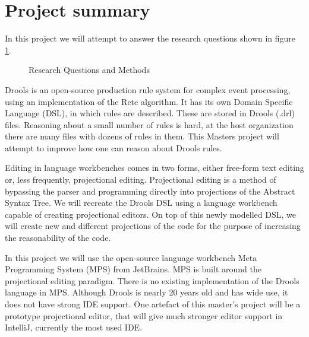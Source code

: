 \section{Project summary}

In this project we will attempt to answer the research questions shown in figure \ref{fig:Research_Questions}.
\begin{figure}[H]
    \centering
    \caption{Research Questions and Methods}
    \label{fig:Research_Questions}
\end{figure}


Drools\cite{browne2009jboss} is an open-source production rule system for complex event processing, using an implementation of the Rete algorithm\cite{forgy1989rete}.
It has its own Domain Specific Language (DSL), in which rules are described.
These are stored in Drools (.drl) files. 
Reasoning about a small number of rules is hard, at the host organization there are many files with dozens of rules in them.
This Masters project will attempt to improve how one can reason about Drools rules.

Editing in language workbenches comes in two forms, either free-form text editing or, less frequently, projectional editing\cite{erdweg2013state}.
Projectional editing is a method of bypassing the parser and programming directly into projections of the Abstract Syntax Tree.
We will recreate the Drools DSL using a language workbench capable of creating projectional editors.  
On top of this newly modelled DSL, we will create new and different projections of the code for the purpose of increasing the reasonability of the code. 

In this project we will use the open-source language workbench Meta Programming System (MPS) from JetBrains\cite{MPS_ProductPage}.
MPS is built around the projectional editing paradigm.
There is no existing implementation of the Drools language in MPS.
Although Drools is nearly 20 years old and has wide use, it does not have strong IDE support.
One artefact of this master's project will be a prototype projectional editor, that will give much stronger editor support in IntelliJ, currently the most used IDE\cite{Java_usage_report}.
